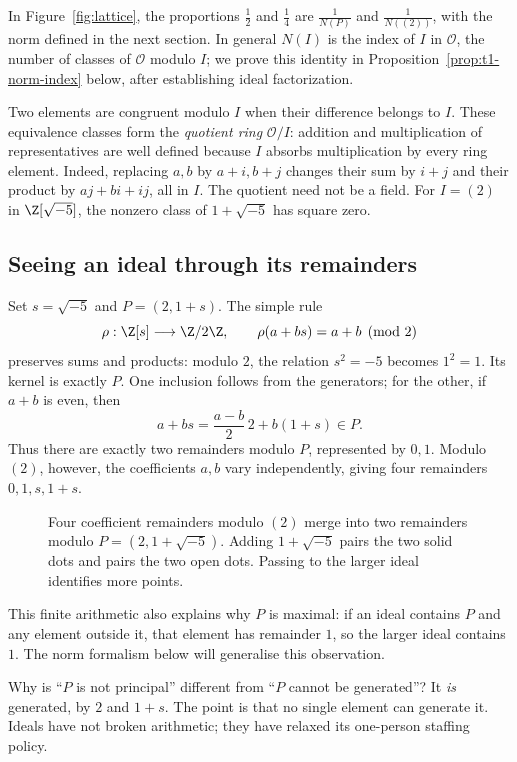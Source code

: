 \begin{remark}
In Figure~\ref{fig:lattice}, the proportions $\frac12$ and $\frac14$ are $\frac1{N(P)}$ and $\frac1{N((2))}$, with the norm defined in the next section. In general $N(I)$ is the index of $I$ in $\mathcal O$, the number of classes of $\mathcal O$ modulo $I$; we prove this identity in Proposition~\ref{prop:t1-norm-index} below, after establishing ideal factorization.
\end{remark}

Two elements are congruent modulo $I$ when their difference belongs
to $I$. These equivalence classes form the \emph{quotient ring}
$\mathcal O/I$: addition and multiplication of representatives are
well defined because $I$ absorbs multiplication by every ring element.
Indeed, replacing $a,b$ by $a+i,b+j$ changes their sum by $i+j$
and their product by $aj+bi+ij$, all in $I$.
The quotient need not be a field. For $I=(2)$ in $\Z[\sqrt{-5}]$,
the nonzero class of $1+\sqrt{-5}$ has square zero.

\subsection*{Seeing an ideal through its remainders}
Set $s=\sqrt{-5}$ and $P=(2,1+s)$. The simple rule
\[
\rho:\Z[s]\longrightarrow\Z/2\Z,
\qquad \rho(a+bs)=a+b\pmod2
\]
preserves sums and products: modulo $2$, the relation $s^2=-5$ becomes
$1^2=1$. Its kernel is exactly $P$. One inclusion follows from the generators;
for the other, if $a+b$ is even, then
\[
a+bs=\frac{a-b}{2}\,2+b(1+s)\in P.
\]
Thus there are exactly two remainders modulo $P$, represented by $0,1$.
Modulo $(2)$, however, the coefficients $a,b$ vary independently, giving four
remainders $0,1,s,1+s$.

\begin{figure}[ht]
\centering{}
\caption{Four coefficient remainders modulo $(2)$ merge into two remainders
modulo $P=(2,1+\sqrt{-5})$. Adding $1+\sqrt{-5}$ pairs the two solid dots and
pairs the two open dots. Passing to the larger ideal identifies more points.}
\label{fig:ideal-quotients}
\end{figure}

This finite arithmetic also explains why $P$ is maximal: if an ideal contains
$P$ and any element outside it, that element has remainder $1$, so the larger
ideal contains $1$. The norm formalism below will generalise this observation.

\begin{think}
Why is ``$P$ is not principal'' different from ``$P$ cannot be generated''?
It \emph{is} generated, by $2$ and $1+s$. The point is that no single element
can generate it. Ideals have not broken arithmetic; they have relaxed its
one-person staffing policy.
\end{think}

